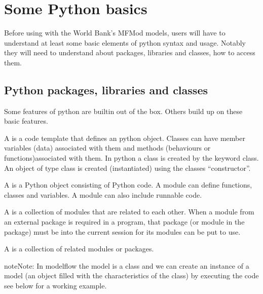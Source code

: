 \documentclass[letterpaper,10pt,english]{jupyterBook}
\begin{document}
\sphinxstepscope


\chapter{Some Python basics}
\label{\detokenize{content/04_PythonEssentials/PythonPackagesEtc:some-python-basics}}\label{\detokenize{content/04_PythonEssentials/PythonPackagesEtc::doc}}
\sphinxAtStartPar
Before using  with the World Bank’s MFMod models, users  will have to understand at least some basic elements of python syntax and usage.  Notably they will need to understand about packages, libraries and classes, how to access them.


\section{Python  packages, libraries and classes}
\label{\detokenize{content/04_PythonEssentials/PythonPackagesEtc:python-packages-libraries-and-classes}}
\sphinxAtStartPar
Some features of python are built\sphinxhyphen{}in out of the box.  Others build up on these basic features.

\sphinxAtStartPar
A  is a code template that defines an python object. Classes can have member variables (data) associated with them and methods (behaviours or functions)associated with them. In python a class is created by the keyword class. An object of type class is created (instantiated) using the classes “constructor”.

\sphinxAtStartPar
A  is a Python object consisting of Python code. A module can define functions, classes and variables. A module can also include runnable code.

\sphinxAtStartPar
A  is a collection of modules that are related to each other. When a module from an external package is required in a program, that package (or module in the package) must  be  into the current session for its modules can be put to use.

\sphinxAtStartPar
A  is a collection of related modules or packages.

\begin{sphinxadmonition}{note}{Note:}
\sphinxAtStartPar
In modelflow the model is a class and we can create an instance of a model (an object filled with the characteristics of the class) by executing the code  see below for a working example.
\end{sphinxadmonition}
\end{document}
